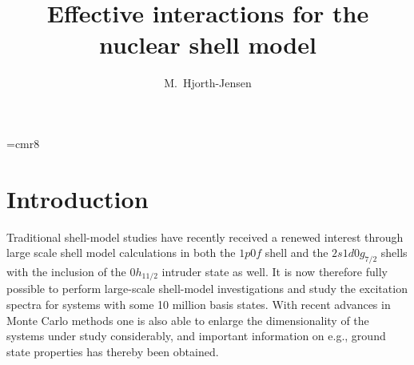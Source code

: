 

\font\eightrm=cmr8




\newcommand{\bra}[1]{\left\langle #1 \right|}
\newcommand{\ket}[1]{\left| #1 \right\rangle}



\title{
       Effective interactions for the nuclear shell model
      }

\author{
        M.\ Hjorth-Jensen
        }

\address{
         Nordita, Copenhagen, Denmark\\
         and\\
         Department of Physics, University of Oslo, Norway
         }

\maketitle



\section{Introduction}


Traditional shell-model studies 
have recently received a renewed
interest through large scale shell model calculations
in both the $1p0f$ shell and the $2s1d0g_{7/2}$ shells with
the inclusion of the $0h_{11/2}$ intruder state as well. 
It is now therefore fully possible to perform large-scale 
shell-model investigations
and study the excitation spectra 
for systems with 
some 10 million basis states. With recent advances in
Monte Carlo methods one is also 
able to enlarge the dimensionality
of the systems under study considerably,
and important information on e.g., ground state properties
has thereby been obtained.

